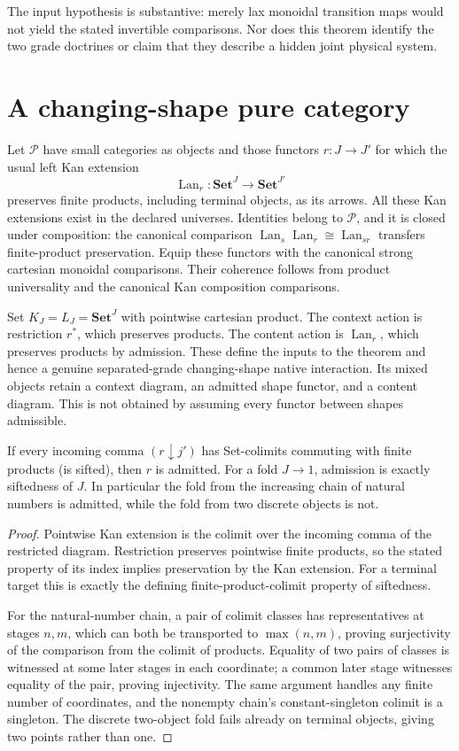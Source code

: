 \documentclass[11pt]{article}
\begin{document}
The input hypothesis is substantive: merely lax monoidal transition maps would not yield the stated invertible comparisons. Nor does this theorem identify the two grade doctrines or claim that they describe a hidden joint physical system.

\section{A changing-shape pure category}
Let $\mathcal P$ have small categories as objects and those functors $r:J\to J'$ for which the usual left Kan extension
\[
 \operatorname{Lan}_r:\mathbf{Set}^J\to\mathbf{Set}^{J'}
\]
preserves finite products, including terminal objects, as its arrows. All these Kan extensions exist in the declared universes. Identities belong to $\mathcal P$, and it is closed under composition: the canonical comparison $\operatorname{Lan}_s\operatorname{Lan}_r\cong\operatorname{Lan}_{sr}$ transfers finite-product preservation. Equip these functors with the canonical strong cartesian monoidal comparisons. Their coherence follows from product universality and the canonical Kan composition comparisons.

Set $K_J=L_J=\mathbf{Set}^J$ with pointwise cartesian product. The context action is restriction $r^*$, which preserves products. The content action is $\operatorname{Lan}_r$, which preserves products by admission. These define the inputs to the theorem and hence a genuine separated-grade changing-shape native interaction. Its mixed objects retain a context diagram, an admitted shape functor, and a content diagram. This is not obtained by assuming every functor between shapes admissible.

\begin{proposition}
If every incoming comma $(r\downarrow j')$ has Set-colimits commuting with finite products (is sifted), then $r$ is admitted. For a fold $J\to1$, admission is exactly siftedness of $J$. In particular the fold from the increasing chain of natural numbers is admitted, while the fold from two discrete objects is not.
\end{proposition}
\begin{proof}
Pointwise Kan extension is the colimit over the incoming comma of the restricted diagram. Restriction preserves pointwise finite products, so the stated property of its index implies preservation by the Kan extension. For a terminal target this is exactly the defining finite-product-colimit property of siftedness.

For the natural-number chain, a pair of colimit classes has representatives at stages $n,m$, which can both be transported to $\max(n,m)$, proving surjectivity of the comparison from the colimit of products. Equality of two pairs of classes is witnessed at some later stages in each coordinate; a common later stage witnesses equality of the pair, proving injectivity. The same argument handles any finite number of coordinates, and the nonempty chain's constant-singleton colimit is a singleton. The discrete two-object fold fails already on terminal objects, giving two points rather than one.
\end{proof}
\end{document}
